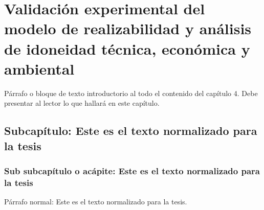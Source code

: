 \chapter{Validación experimental del modelo de realizabilidad y análisis de idoneidad técnica, económica y ambiental}
\label{cap:validacion}

Párrafo o bloque de texto introductorio al todo el contenido del capítulo 4. Debe presentar al lector lo que hallará en este capítulo.

\section{Subcapítulo: Este es el texto normalizado para la tesis}

\subsection{Sub subcapítulo o acápite: Este es el texto normalizado para la tesis}

Párrafo normal: Este es el texto normalizado para la tesis.
